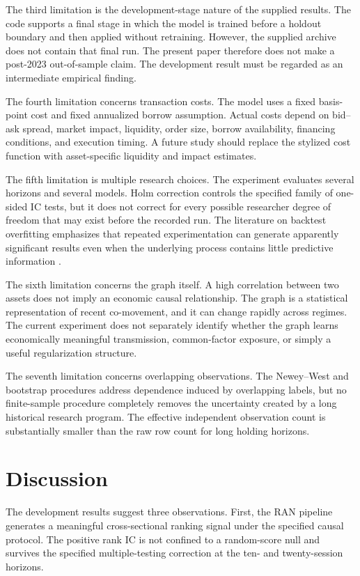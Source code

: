 \documentclass[10pt]{article}
\begin{document}
The third limitation is the development-stage nature of the supplied results. The code supports a final stage in which the model is trained before a holdout boundary and then applied without retraining. However, the supplied archive does not contain that final run. The present paper therefore does not make a post-2023 out-of-sample claim. The development result must be regarded as an intermediate empirical finding.

The fourth limitation concerns transaction costs. The model uses a fixed basis-point cost and fixed annualized borrow assumption. Actual costs depend on bid--ask spread, market impact, liquidity, order size, borrow availability, financing conditions, and execution timing. A future study should replace the stylized cost function with asset-specific liquidity and impact estimates.

The fifth limitation is multiple research choices. The experiment evaluates several horizons and several models. Holm correction controls the specified family of one-sided IC tests, but it does not correct for every possible researcher degree of freedom that may exist before the recorded run. The literature on backtest overfitting emphasizes that repeated experimentation can generate apparently significant results even when the underlying process contains little predictive information \citep{bailey2017}.

The sixth limitation concerns the graph itself. A high correlation between two assets does not imply an economic causal relationship. The graph is a statistical representation of recent co-movement, and it can change rapidly across regimes. The current experiment does not separately identify whether the graph learns economically meaningful transmission, common-factor exposure, or simply a useful regularization structure.

The seventh limitation concerns overlapping observations. The Newey--West and bootstrap procedures address dependence induced by overlapping labels, but no finite-sample procedure completely removes the uncertainty created by a long historical research program. The effective independent observation count is substantially smaller than the raw row count for long holding horizons.

\section{Discussion}

The development results suggest three observations. First, the RAN pipeline generates a meaningful cross-sectional ranking signal under the specified causal protocol. The positive rank IC is not confined to a random-score null and survives the specified multiple-testing correction at the ten- and twenty-session horizons.
\end{document}

